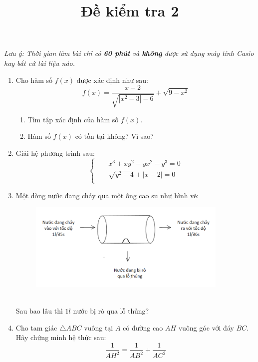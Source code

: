 \documentclass{article}
\title{Đề kiểm tra 2}
\begin{document}
\maketitle
\textit{Lưu ý: Thời gian làm bài chỉ có \textbf{60 phút} và \textbf{không} được sử dụng máy tính Casio hay bất cứ tài liệu nào.}
\begin{enumerate}[start=1,label={\bfseries Câu  \arabic*:},leftmargin=1in]
    \item Cho hàm số $f(x)$ được xác định như sau:
    $$f(x)=\frac{x-2}{\sqrt{|x^2-3|-6}}+\sqrt{9-x^2}$$
\begin{enumerate}
    \item Tìm tập xác định của hàm số $f(x)$.
    \item Hàm số $f(x)$ có tồn tại không? Vì sao?
\end{enumerate}
    \item Giải hệ phương trình sau:
    \begin{equation*}
        \left\{\begin{aligned}
            &&x^3+xy^2-yx^2-y^3=0\\
            &&\sqrt{y^2-4}+|x-2|=0\\
        \end{aligned}\right.
    \end{equation*}
    \item Một dòng nước đang chảy qua một ống cao su như hình vẽ:
    \begin{figure}[h]
        \centering
        \includegraphics[width=0.9\textwidth]{a_pipe.png}
        \label{nem_ngang}
        \end{figure}
   \\Sau bao lâu thì $1l$ nước bị rò qua lỗ thủng?
   \item Cho tam giác $\triangle ABC$ vuông tại $A$ có đường cao $AH$ vuông góc với đáy $BC$. Hãy chứng minh hệ thức sau:
   $$\frac{1}{AH^2}=\frac{1}{AB^2}+\frac{1}{AC^2}$$
\end{enumerate}
\end{document}
